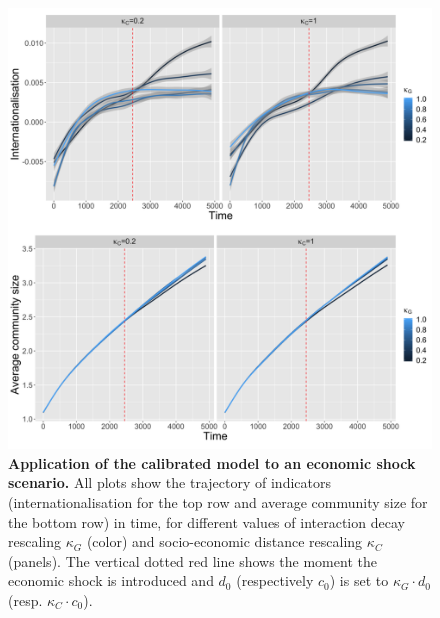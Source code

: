 \documentclass[10pt,letterpaper]{article}
\begin{document}



\begin{figure}
	\begin{center}
    \includegraphics[width=\linewidth]{figures/Fig9.png}
    \end{center}
    \vspace{2cm}
	\caption{\textbf{Application of the calibrated model to an economic shock scenario.} All plots show the trajectory of indicators (internationalisation for the top row and average community size for the bottom row) in time, for different values of interaction decay rescaling $\kappa_G$ (color) and socio-economic distance rescaling $\kappa_C$ (panels). The vertical dotted red line shows the moment the economic shock is introduced and $d_0$ (respectively $c_0$) is set to $\kappa_G \cdot d_0$ (resp. $\kappa_C \cdot c_0$).\label{fig:fig9}}
\end{figure}
\end{document}
